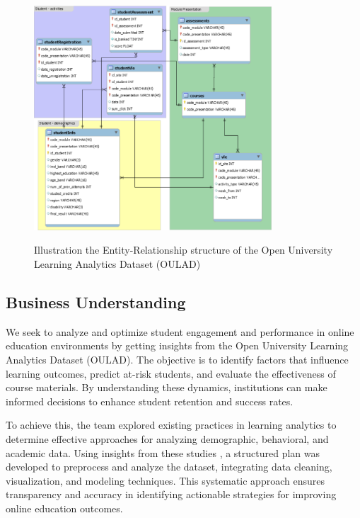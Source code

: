 \begin{figure}
  \begin{center}
  \includegraphics[width=3.5in]{photo/schema.PNG}\\
  \caption{Illustration the Entity-Relationship structure of the Open University Learning Analytics Dataset (OULAD)}
  \label{pu_image}
  \end{center}
\end{figure}


\subsection*{Business Understanding}

We seek to analyze and optimize student engagement and performance in online education environments by getting insights from the Open University Learning Analytics Dataset (OULAD). The objective is to identify factors that influence learning outcomes, predict at-risk students, and evaluate the effectiveness of course materials. By understanding these dynamics, institutions can make informed decisions to enhance student retention and success rates. 

To achieve this, the team explored existing practices in learning analytics to determine effective approaches for analyzing demographic, behavioral, and academic data. Using insights from these studies \cite{IMD2019, Kuh2007, Waskom2021}, a structured plan was developed to preprocess and analyze the dataset, integrating data cleaning, visualization, and modeling techniques. This systematic approach ensures transparency and accuracy in identifying actionable strategies for improving online education outcomes.


